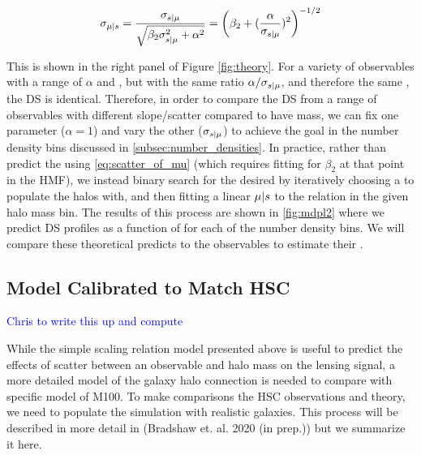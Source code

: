 \documentclass[a4paper,fleqn,usenatbib]{mnras}
\begin{document}
\begin{equation}
    \sigma_{\mu{} | s{}}{} 
    	= \frac{\sigma_{s{} | \mu{}}}{\sqrt{\beta_2 \sigma_{s{} | \mu{}}^2 + \alpha^2}}
        = \left(\beta_2 + (\frac{\alpha}{\sigma_{s{} | \mu{}}})^2\right)^{-1/2}
    \label{eq:ratio_is_what_matters}
\end{equation}

This is shown in the right panel of Figure \ref{fig:theory}. For a variety of observables with a range of $\alpha$ and \scatterObsSymMhalo{}, but with the same ratio $\alpha / \sigma_{s{} | \mu{}}$, and therefore the same \scatterMhaloObsSym{}, the DS is identical.
Therefore, in order to compare the DS from a range of observables with different slope/scatter compared to have mass, we can fix one parameter ($\alpha = 1$) and vary the other ($\sigma_{s{} | \mu{}}$) to achieve the goal \scatterMhaloObsSym{} in the number density bins discussed in \ref{subsec:number_densities}.
In practice, rather than predict the \scatterMhaloObsSym{} using \ref{eq:scatter_of_mu} (which requires fitting for $\beta_2$ at that point in the HMF), we instead binary search for the desired \scatterMhaloObsSym{} by iteratively choosing a \scatterObsSymMhalo{} to populate the halos with, and then fitting a linear $\mu | s$ to the relation in the given halo mass bin.
The results of this process are shown in \ref{fig:mdpl2} where we predict DS profiles as a function of \scatterMhaloObsSym{} for each of the number density bins. We will compare these theoretical predicts to the observables to estimate their \scatterMhaloObsSym{}.


\subsection{Model Calibrated to Match HSC}

\textcolor{blue}{Chris to write this up and compute}

While the simple scaling relation model presented above is useful to predict the effects of scatter between an observable and halo mass on the lensing signal, a more detailed model of the galaxy halo connection is needed to compare with specific model of M100. To make comparisons the HSC observations and theory, we need to populate the simulation with realistic galaxies. This process will be described in more detail in (Bradshaw et. al. 2020 (in prep.)) but we summarize it here.
\end{document}
